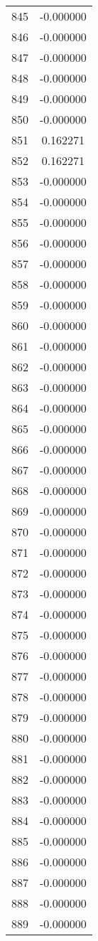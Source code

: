 \documentclass[12pt]{article}
\begin{document}
\begin{longtable}{@{}cc@{}}
845 & -0.000000 \\
846 & -0.000000 \\
847 & -0.000000 \\
848 & -0.000000 \\
849 & -0.000000 \\
850 & -0.000000 \\
851 & 0.162271 \\
852 & 0.162271 \\
853 & -0.000000 \\
854 & -0.000000 \\
855 & -0.000000 \\
856 & -0.000000 \\
857 & -0.000000 \\
858 & -0.000000 \\
859 & -0.000000 \\
860 & -0.000000 \\
861 & -0.000000 \\
862 & -0.000000 \\
863 & -0.000000 \\
864 & -0.000000 \\
865 & -0.000000 \\
866 & -0.000000 \\
867 & -0.000000 \\
868 & -0.000000 \\
869 & -0.000000 \\
870 & -0.000000 \\
871 & -0.000000 \\
872 & -0.000000 \\
873 & -0.000000 \\
874 & -0.000000 \\
875 & -0.000000 \\
876 & -0.000000 \\
877 & -0.000000 \\
878 & -0.000000 \\
879 & -0.000000 \\
880 & -0.000000 \\
881 & -0.000000 \\
882 & -0.000000 \\
883 & -0.000000 \\
884 & -0.000000 \\
885 & -0.000000 \\
886 & -0.000000 \\
887 & -0.000000 \\
888 & -0.000000 \\
889 & -0.000000 \\

\end{longtable}
\end{document}
